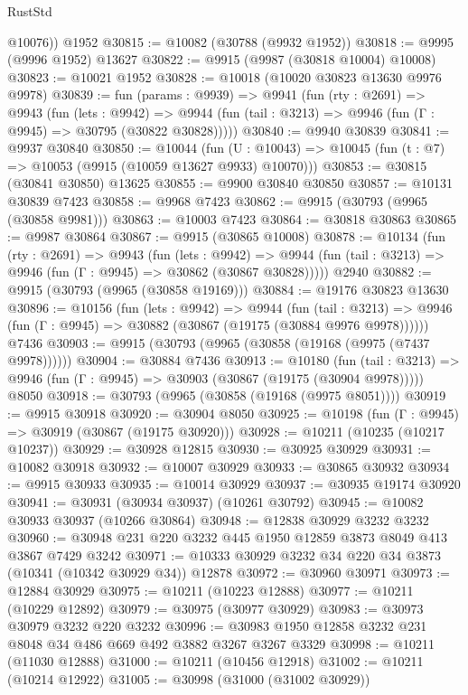 \begin{lexlean}{RustStd}
\begin{coremodule}
        @10076))
    @1952
@30815 := @10082 (@30788 (@9932 @1952))
@30818 := @9995 (@9996 @1952) @13627
@30822 := @9915 (@9987 (@30818 @10004) @10008)
@30823 := @10021 @1952
@30828 := @10018 (@10020 @30823 @13630 @9976 @9978)
@30839 := fun (params : @9939) =>
  @9941
    (fun (rty : @2691) =>
    @9943
      (fun (lets : @9942) =>
      @9944 (fun (tail : @3213) => @9946 (fun (Γ : @9945) => @30795 (@30822 @30828)))))
@30840 := @9940 @30839
@30841 := @9937 @30840
@30850 := @10044
    (fun (U : @10043) => @10045 (fun (t : @7) => @10053 (@9915 (@10059 @13627 @9933) @10070)))
@30853 := @30815 (@30841 @30850) @13625
@30855 := @9900 @30840 @30850
@30857 := @10131 @30839 @7423
@30858 := @9968 @7423
@30862 := @9915 (@30793 (@9965 (@30858 @9981)))
@30863 := @10003 @7423
@30864 := @30818 @30863
@30865 := @9987 @30864
@30867 := @9915 (@30865 @10008)
@30878 := @10134
    (fun (rty : @2691) =>
    @9943
      (fun (lets : @9942) =>
      @9944 (fun (tail : @3213) => @9946 (fun (Γ : @9945) => @30862 (@30867 @30828)))))
    @2940
@30882 := @9915 (@30793 (@9965 (@30858 @19169)))
@30884 := @19176 @30823 @13630
@30896 := @10156
    (fun (lets : @9942) =>
    @9944
      (fun (tail : @3213) =>
      @9946 (fun (Γ : @9945) => @30882 (@30867 (@19175 (@30884 @9976 @9978))))))
    @7436
@30903 := @9915 (@30793 (@9965 (@30858 (@19168 (@9975 (@7437 @9978))))))
@30904 := @30884 @7436
@30913 := @10180
    (fun (tail : @3213) => @9946 (fun (Γ : @9945) => @30903 (@30867 (@19175 (@30904 @9978)))))
    @8050
@30918 := @30793 (@9965 (@30858 (@19168 (@9975 @8051))))
@30919 := @9915 @30918
@30920 := @30904 @8050
@30925 := @10198 (fun (Γ : @9945) => @30919 (@30867 (@19175 @30920)))
@30928 := @10211 (@10235 (@10217 @10237))
@30929 := @30928 @12815
@30930 := @30925 @30929
@30931 := @10082 @30918
@30932 := @10007 @30929
@30933 := @30865 @30932
@30934 := @9915 @30933
@30935 := @10014 @30929
@30937 := @30935 @19174 @30920
@30941 := @30931 (@30934 @30937) (@10261 @30792)
@30945 := @10082 @30933 @30937 (@10266 @30864)
@30948 := @12838 @30929 @3232 @3232
@30960 := @30948 @231 @220 @3232 @445 @1950 @12859 @3873 @8049 @413 @3867 @7429 @3242
@30971 := @10333 @30929 @3232 @34 @220 @34 @3873 (@10341 (@10342 @30929 @34)) @12878
@30972 := @30960 @30971
@30973 := @12884 @30929
@30975 := @10211 (@10223 @12888)
@30977 := @10211 (@10229 @12892)
@30979 := @30975 (@30977 @30929)
@30983 := @30973 @30979 @3232 @220 @3232
@30996 := @30983 @1950 @12858 @3232 @231 @8048 @34 @486 @669 @492 @3882 @3267 @3267 @3329
@30998 := @10211 (@11030 @12888)
@31000 := @10211 (@10456 @12918)
@31002 := @10211 (@10214 @12922)
@31005 := @30998 (@31000 (@31002 @30929))

\end{coremodule}
\end{lexlean}
